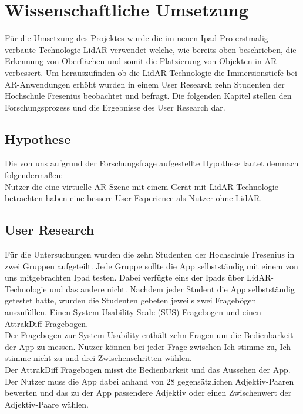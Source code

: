 \documentclass[titlepage, a4paper, 11pt]{scrartcl}
\begin{document}
  \section{Wissenschaftliche Umsetzung}
  Für die Umsetzung des Projektes wurde die im neuen Ipad Pro erstmalig verbaute Technologie LidAR verwendet welche, wie bereits oben beschrieben, die Erkennung von Oberflächen und somit die Platzierung von Objekten in AR verbessert. Um herauszufinden ob die LidAR-Technologie die Immersionstiefe bei AR-Anwendungen erhöht wurden in einem User Research zehn Studenten der Hochschule Fresenius beobachtet und befragt. Die folgenden Kapitel stellen den Forschungsprozess und die Ergebnisse des User Research dar.
  \subsection{Hypothese}
  Die von uns aufgrund der Forschungsfrage aufgestellte Hypothese lautet demnach folgendermaßen:\\

  \glqq Nutzer die eine virtuelle AR-Szene mit einem Gerät mit LidAR-Technologie betrachten haben eine bessere User Experience als Nutzer ohne LidAR. \grqq{}
  \subsection{User Research}
  Für die Untersuchungen wurden die zehn Studenten der Hochschule Fresenius in zwei Gruppen aufgeteilt. Jede Gruppe sollte die App selbstständig mit einem von uns mitgebrachten Ipad testen. Dabei verfügte eins der Ipads über LidAR-Technologie und das andere nicht. Nachdem jeder Student die App selbstständig getestet hatte, wurden die Studenten gebeten jeweils zwei Fragebögen auszufüllen. Einen System Usability Scale (SUS) \cite{SUS} Fragebogen und einen AttrakDiff \cite{AttrakDiff} Fragebogen.\\ 
  Der Fragebogen zur System Usability enthält zehn Fragen um die Bedienbarkeit der App zu messen. Nutzer können bei jeder Frage zwischen \glqq Ich stimme zu\grqq, \glqq Ich stimme nicht zu\grqq{} und drei Zwischenschritten wählen.\\ 
  Der AttrakDiff Fragebogen misst die Bedienbarkeit und das Aussehen der App. Der Nutzer muss die App dabei anhand von 28 gegensätzlichen Adjektiv-Paaren bewerten und das zu der App passendere Adjektiv oder einen Zwischenwert der Adjektiv-Paare wählen.
\end{document}

